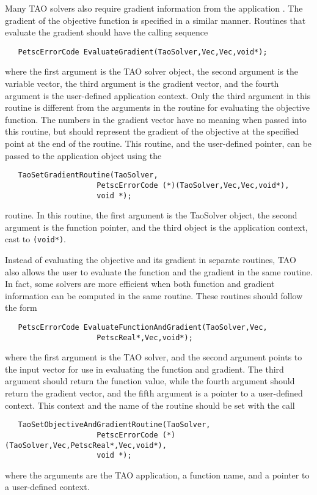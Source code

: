 Many TAO solvers also require gradient information from the 
application .
  The gradient of the objective function is specified in a similar manner.
Routines that evaluate the gradient should have the calling sequence
\begin{verbatim}
   PetscErrorCode EvaluateGradient(TaoSolver,Vec,Vec,void*);
\end{verbatim}
\noindent
where the first
argument is the TAO solver object, the second argument is the variable
vector, the third argument is the gradient vector, and the fourth argument is
the user-defined application context.  Only the third argument in this
routine is different from the arguments in the routine for evaluating
the objective function.  The numbers in the gradient vector have no
meaning when passed into this routine, but should represent the gradient
of the objective at the specified point at the end of the routine.
This routine, and the user-defined pointer, can be passed to the application
object using the  
\begin{verbatim}
   TaoSetGradientRoutine(TaoSolver,
                     PetscErrorCode (*)(TaoSolver,Vec,Vec,void*),
                     void *);
\end{verbatim}
routine. 
In this routine, the first argument is the TaoSolver object, the second argument
is the function pointer, and the third object is the application context, cast
to {\tt (void*)}.

Instead of evaluating the objective and its gradient in separate
routines, TAO also allows the user to evaluate the function and the gradient
in the same routine.  In fact, some solvers are more efficient when
both function and gradient information can be computed in the same routine.
These routines should follow the form
\begin{verbatim}
   PetscErrorCode EvaluateFunctionAndGradient(TaoSolver,Vec,
                     PetscReal*,Vec,void*);
\end{verbatim}
\noindent
where the first
argument is the TAO solver, and the second
argument points to the input vector for use in evaluating the
function and gradient. The third argument should return the
function value, while the fourth argument should return the gradient vector,
and the fifth argument is a pointer to a user-defined context.
This context and the name of the routine should be set with the
call 
\begin{verbatim}
   TaoSetObjectiveAndGradientRoutine(TaoSolver,
                     PetscErrorCode (*)(TaoSolver,Vec,PetscReal*,Vec,void*),
                     void *);
\end{verbatim}
where the arguments are the TAO application, a
function name, and a pointer to a user-defined context.


